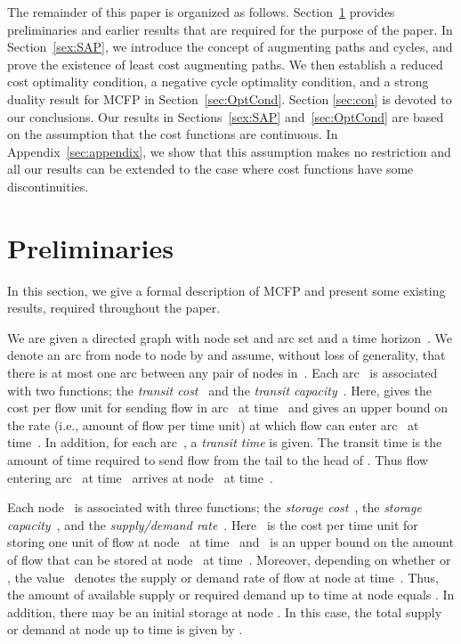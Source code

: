 \documentclass{svjour3}                     \smartqed
\begin{document}
The remainder of this paper is organized as follows. Section~\ref{sec:preliminaries} provides preliminaries and earlier results that are required for the purpose of the paper. In Section~\ref{sex:SAP}, we introduce the concept of augmenting paths and cycles, and prove the existence of least cost augmenting paths. We then establish a reduced cost optimality condition, a negative cycle optimality condition, and a strong duality result for \mbox{MCFP} in Section~\ref{sec:OptCond}. Section \ref{sec:con} is devoted to our conclusions. Our results in Sections~\ref{sex:SAP} and~\ref{sec:OptCond} are based on the assumption that the cost functions are continuous. In  Appendix~\ref{sec:appendix}, we show that this assumption makes no restriction and all our results can be extended to the case where cost functions have some discontinuities. 


\section{Preliminaries}
\label{sec:preliminaries}

In this section, we give a formal description of MCFP and present some existing results, required throughout the paper.

We are given a directed graph  with node set  and arc set  and a time horizon~. We denote an arc  from node  to node  by  and assume, without loss of generality, that there is at most one arc between any pair of nodes in~. Each arc~ is associated with two functions; the {\em transit cost}~ and the {\em transit capacity}~. Here,  gives the cost per flow unit for sending flow in arc~ at time~ and  gives an upper bound on the rate (i.e., amount of flow per time unit) at which flow can enter arc~ at time~. In addition, for each arc~, a {\em transit time}  is given. The transit time is the amount of time required to send flow from the tail to the head of . Thus flow entering arc~ at time~ arrives at node~ at time~.

Each node~ is associated with three functions; the {\em storage cost}~, the {\em storage capacity}~, and the {\em supply/demand rate}~. Here~ is the cost per time unit for storing one unit of flow at node~ at time~ and~ is an upper bound on the amount of flow that can be stored at node~ at time~. Moreover, depending on whether  or , the value~ denotes the supply or demand rate of flow at node  at time~. Thus, the amount of available supply or required demand up to time  at node  equals .  In addition, there may be an initial storage  at node . In this case, the total supply or demand at node  up to time  is given by .
\end{document}
